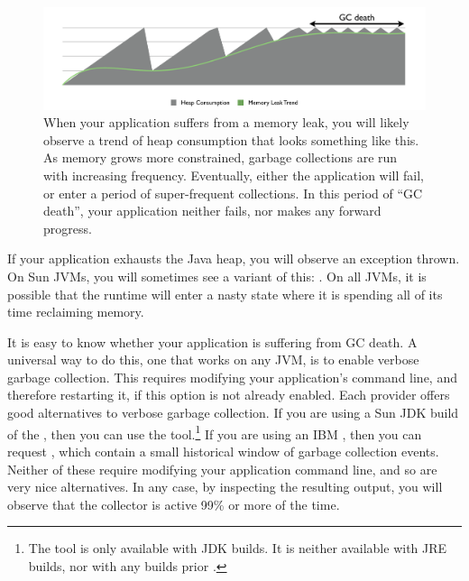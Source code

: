 \begin{figure}
\centering
	\includegraphics[width=\textwidth]{part2/Figures/fundamentals/leaktrend}
	\caption{When your application suffers from a memory leak, you will likely
	observe a trend of heap consumption that looks something like this. As memory
	grows more constrained, garbage collections are run with increasing frequency.
	Eventually, either the application will fail, or enter a period of
	super-frequent collections. In this period of ``GC death'', your application
	neither fails, nor makes any forward progress. }
	\label{fig:memory-leak-trend}
\end{figure}


If your application exhausts the Java heap, you will observe an
 exception thrown. On
Sun JVMs, you will sometimes see a variant of this: . On all JVMs, it is possible that
the runtime will enter a nasty state where it is spending all of its time
reclaiming memory.


It is easy to know whether your application is suffering from GC death. A
universal way to do this, one that works on any JVM, is to enable verbose
garbage collection. This requires modifying
your application's command line, and therefore restarting it, if this option is
not already enabled. Each \jre provider offers good alternatives to verbose
garbage collection. If you are using a Sun JDK build of the \jre, then you can
use the  tool.\footnote{The  tool
is only available with JDK builds. It is neither available with JRE builds, nor
with any builds prior \javafive.} If you are using an IBM \jre, then you can
request , which contain a small historical window of  garbage
collection events. Neither of these require modifying your
application command line, and so are very nice alternatives. In any case, by
inspecting the resulting output, you will observe that the collector is active
99\% or more of the time.




